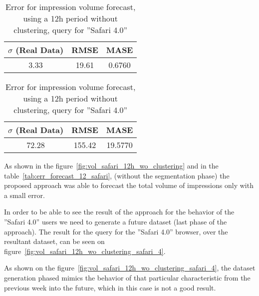 \begin{table}[!ht]
\centering
\footnotesize
\begin{minipage}[t]{0.45\linewidth}
\centering
\begin{tabular}{ccc}
 $\sigma$ (Real Data) & RMSE & MASE   \\ \hline
 3.33      & 19.61        & 0.6760   \\
\end{tabular}

\vspace{0.5cm}

\caption[Volume
impression forecast error, safari]{Error for impression volume
forecast, using a 12h period without clustering}
\label{tab:err_forecast_12_safari}
\end{minipage}
\quad
\begin{minipage}[t]{0.45\linewidth}
\centering
\begin{tabular}{ccc}
 $\sigma$ (Real Data) & RMSE & MASE   \\ \hline
72.28      &  155.42       & 19.5770   \\
\end{tabular}

\vspace{0.5cm}

\caption[Volume
impression forecast error, safari, without segmentation]{Error for impression volume
forecast, using a 12h period without clustering, query for ''Safari 4.0''}
\label{tab:err_forecast_12_safari_wo_clustering_safari_4}

\end{minipage}
\end{table}

As shown in the figure~\ref{fig:vol_safari_12h_wo_clustering} and in the
table~\ref{tab:err_forecast_12_safari}, (without the segmentation phase) the
proposed approach was able to forecast the total volume of impressions only with
a small error.

In order to be able to see the result of the approach for the behavior of the
''Safari 4.0'' users we need to generate a future dataset (last phase of the
approach). The result for the query for the ''Safari 4.0'' browser, over the
resultant dataset, can be seen
on figure~\ref{fig:vol_safari_12h_wo_clustering_safari_4}.

As shown on the figure~\ref{fig:vol_safari_12h_wo_clustering_safari_4}, the
dataset generation phased mimics the behavior of that particular characteristic
from the previous week into the future, which in this case is not a good result.

